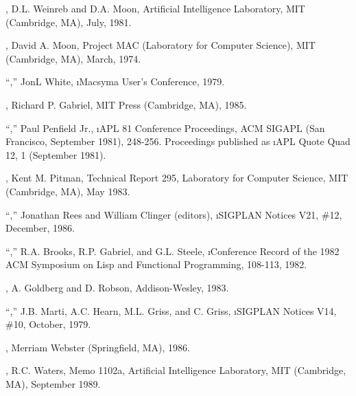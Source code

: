 \item{\bull} {\Chinual}, 	D.L. Weinreb and D.A. Moon, 	Artificial Intelligence Laboratory, MIT (Cambridge, MA), July, 1981.

\item{\bull} {\Moonual}, 	David A. Moon, Project MAC (Laboratory for Computer Science),
        MIT (Cambridge, MA), March, 1974.

\item{\bull} ``{\NILReport},'' 
        JonL White, \i{Macsyma User's Conference}, 1979.

\item{\bull} {\GabrielBenchmarks}, 	Richard P. Gabriel, MIT Press (Cambridge, MA), 1985.

\item{\bull} ``{\PrincipalValues},'' 
        Paul Penfield Jr., \i{APL 81 Conference Proceedings},
        ACM SIGAPL (San Francisco, September 1981), 248-256.
        Proceedings published as \i{APL Quote Quad 12}, 1 (September 1981).

\item{\bull} {\Pitmanual}, 	Kent M. Pitman,  	Technical Report 295, 	Laboratory for Computer Science, MIT (Cambridge, MA), May 1983.

\item{\bull} ``{\RevisedCubedScheme},''
        Jonathan Rees and William Clinger (editors), 
        \i{SIGPLAN Notices} V21, \#12, December, 1986.

\item{\bull} ``\SOneCLPaper,'' 	R.A. Brooks, R.P. Gabriel, and G.L. Steele, 	\i{Conference Record of the 1982 ACM Symposium on Lisp and Functional Programming}, 	108-113, 1982.

\item{\bull} \SmalltalkBook,
        A. Goldberg and D. Robson, Addison-Wesley, 1983.

\item{\bull} ``{\StandardLispReport},''
        J.B. Marti, A.C. Hearn, M.L. Griss, and C. Griss,
        \i{SIGPLAN Notices} V14, \#10, October, 1979.

\item{\bull} {\WebstersDictionary}, 	Merriam Webster (Springfield, MA), 1986.

\item{\bull} \XPPaper,
        R.C. Waters, 	Memo 1102a, 	Artificial Intelligence Laboratory, MIT (Cambridge, MA), September 1989.

\endlist
